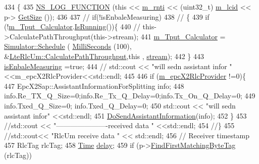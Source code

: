\begin{DoxyCode}
434 \{
435   \hyperlink{log-macros-disabled_8h_a90b90d5bad1f39cb1b64923ea94c0761}{NS\_LOG\_FUNCTION} (\textcolor{keyword}{this} << \hyperlink{classns3_1_1LteRlc_a48ab0a78e7f2687337075b1c8832df70}{m\_rnti} << (uint32\_t) \hyperlink{classns3_1_1LteRlc_a051085e9b27883e7ba4b98ad7242fd8a}{m\_lcid} << p->
      \hyperlink{classns3_1_1Packet_a462855c9929954d4301a4edfe55f4f1c}{GetSize} ());
436 
437  \textcolor{comment}{// if(!isEnbaleMeasuring)}
438  \textcolor{comment}{// \{}
439         \textcolor{keywordflow}{if} (!\hyperlink{classns3_1_1LteRlcUm_af24ae932eded5469f4ad2185b656bee1}{m\_Tput\_Calculator}.\hyperlink{classns3_1_1EventId_aabf8476d1a080c199ea0c6aa9ccea372}{IsRunning}())\{
440         \textcolor{comment}{//  this->CalculatePathThroughput(this->stream);}
441                 \hyperlink{classns3_1_1LteRlcUm_af24ae932eded5469f4ad2185b656bee1}{m\_Tput\_Calculator} = \hyperlink{classns3_1_1Simulator_a671882c894a08af4a5e91181bf1eec13}{Simulator::Schedule} (
      \hyperlink{group__timecivil_gaf26127cf4571146b83a92ee18679c7a9}{MilliSeconds} (100), &\hyperlink{classns3_1_1LteRlcUm_a54fff036c0cfaf8a314a375578f410bc}{LteRlcUm::CalculatePathThroughput},\textcolor{keyword}{this} , 
      \hyperlink{classns3_1_1LteRlcUm_a8509783beb5d5625757bdf93549079f6}{stream});
442         \}
443   \hyperlink{classns3_1_1LteRlcUm_a33e4345196c0c97f6b1954e108ccbb45}{isEnbaleMeasuring} =\textcolor{keyword}{true};
444 \textcolor{comment}{// std::cout << "will sedn assistant infor  " <<m\_epcX2RlcProvider<<std::endl;}
445 
446   \textcolor{keywordflow}{if} (\hyperlink{classns3_1_1LteRlc_aa997bbf2807b79443887abd57facd1c8}{m\_epcX2RlcProvider} !=0)\{
447   EpcX2Sap::AssistantInformationForSplitting info;
448  info.Re\_TX\_Q\_Size=0;info.Re\_Tx\_Q\_Delay=0;info.Tx\_On\_Q\_Delay=0;
449  info.Txed\_Q\_Size=0; info.Txed\_Q\_Delay=0;
450  std::cout << \textcolor{stringliteral}{"will sedn assistant infor"} <<std::endl;
451  \hyperlink{classns3_1_1LteRlcUm_a982377231676cdfa87ac26a4c182f239}{DoSendAssistantInformation}(info);
452   \}
453   \textcolor{comment}{//std::cout << "----------------------received data   " <<std::endl;}
454   \textcolor{comment}{//\}}
455 \textcolor{comment}{//std::cout<< "RlcUm receive data " << std::endl;}
456   \textcolor{comment}{// Receiver timestamp}
457   RlcTag rlcTag;
458   \hyperlink{namespacens3_1_1TracedValueCallback_a7ffd3e7c142ffe7c8a1d2db9b8de38ec}{Time} \hyperlink{lte_2model_2fading-traces_2fading__trace__generator_8m_a7964e6aa8f61a9d28973c8267a606ad8}{delay};
459   \textcolor{keywordflow}{if} (p->\hyperlink{classns3_1_1Packet_a2e1403c2411495827012fe000823c16a}{FindFirstMatchingByteTag} (rlcTag))

\end{DoxyCode}
